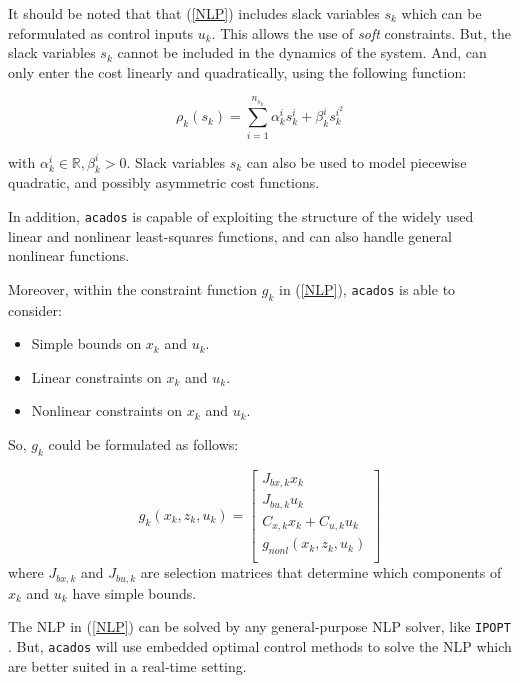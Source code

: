 \documentclass{thesisreport}
\begin{document}
    
    It should be noted that that (\ref{NLP}) includes slack variables $s_k$ which can be reformulated as control inputs $u_k$. This allows the use of \textit{soft} constraints. 
But, the slack variables $s_k$ cannot be included in the dynamics of the system. And, can only enter the cost linearly and quadratically, using the following function:

\begin{equation}
	\rho_k(s_k) = \sum_{i=1}^{n_{s_k}} \alpha_k^i s_k^i + \beta_k^i s_k^{i^2}
\end{equation}

with $\alpha_k^i \in \mathbb{R}, \beta_k^i > 0$. Slack variables $s_k$ can also be used to model piecewise quadratic, and possibly asymmetric cost functions.
    
In addition, \texttt{acados} is capable of exploiting the structure of the widely used linear and nonlinear least-squares functions, and can also handle general nonlinear functions.
    
Moreover, within the constraint function $g_k$ in (\ref{NLP}), \texttt{acados} is able to consider: 

\begin{itemize}
	\item Simple bounds on $x_k$ and $u_k$.
	\item Linear constraints on $x_k$ and $u_k$.
	\item Nonlinear constraints on $x_k$ and $u_k$.
\end{itemize}
    
So, $g_k$ could be formulated as follows:

\begin{equation}
        g_k(x_k, z_k, u_k) = \begin{bmatrix}
            J_{bx,k}x_k \\
            J_{bu,k}u_k \\
            C_{x,k}x_k + C_{u,k}u_k \\
            g_{nonl}(x_k, z_k, u_k) \\
        \end{bmatrix}
    \end{equation}
    where $J_{bx,k}$ and $J_{bu,k}$ are selection matrices that determine which components of $x_k$ and $u_k$ have simple bounds.

The NLP in (\ref{NLP}) can be solved by any general-purpose NLP solver, like \texttt{IPOPT} \cite{IPOPT}. But, \texttt{acados} will use embedded optimal control methods to solve the NLP which are better suited in a real-time setting.
\end{document}

